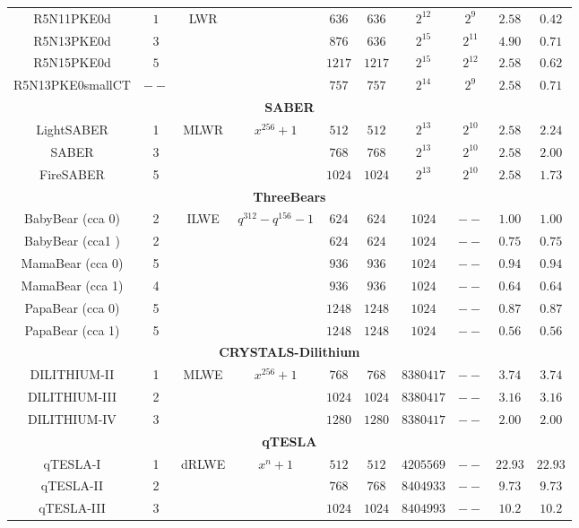 \documentclass{cta-author}
\begin{document}
\begin{table}[pt]
\begin{tabular}{ c| c| c | c || c | c | c |c||c| c }
		
		
		
		\hline
		R5N11PKE0d&$1$&\multirow{4}{*}{LWR}&& $636$&$636$&$2^{12}$&$2^{9}$& $2.58$&$0.42$\\
		
		
		R5N13PKE0d&$3$&&& $876$&$636$&$2^{15}$&$2^{11}$& $4.90$&$0.71$\\
		
		R5N15PKE0d&$5$&&& $1217$&$1217$&$2^{15}$&$2^{12}$& $2.58$&$0.62$\\
		
		R5N13PKE0smallCT&$--$&&& $757$&$757$&$2^{14}$&$2^{9}$& $2.58$&$0.71$\\
		\hline
		\hline
		\multicolumn{10}{c}{\textbf{SABER}}\\
		\hline
		LightSABER&1&\multirow{3}{*}{MLWR}&\multirow{3}{*}{$x^{256}+1$}& $512$&$512$&$2^{13}$&$2^{10}$& $2.58$&$2.24$\\
		SABER&3&&& $768$&$768$&$2^{13}$&$2^{10}$& $2.58$&$2.00$\\
		FireSABER&5&&& $1024$&$1024$&$2^{13}$&$2^{10}$& $2.58$&$1.73$\\
		\hline
		\hline
		\multicolumn{10}{c}{\textbf{ThreeBears}}\\
		\hline
		
		BabyBear (cca 0)&2&\multirow{6}{*}{ILWE}&\multirow{6}{*}{$q^{312}-q^{156}-1$}& $624$&$624$&$1024$&$--$& $1.00$&$1.00$\\
		BabyBear (cca1 )&2&&& $624$&$624$&$1024$&$--$& $0.75$&$0.75$\\
		
		MamaBear (cca 0)&5&&& $936$&$936$&$1024$&$--$& $0.94$&$0.94$\\
		MamaBear (cca 1)&4&&& $936$&$936$&$1024$&$--$& $0.64$&$0.64$\\
		PapaBear (cca 0)&5&&& $1248$&$1248$&$1024$&$--$& $0.87$&$0.87$\\
		PapaBear (cca 1)&5&&& $1248$&$1248$&$1024$&$--$& $0.56$&$0.56$\\
		\hline
		\hline
		\multicolumn{10}{c}{\textbf{CRYSTALS-Dilithium}}\\
		\hline
		
		DILITHIUM-II&1&\multirow{3}{*}{MLWE}&\multirow{3}{*}{$x^{256}+1$}& $768$&$768$&$8380417$&$--$& $3.74$&$3.74$\\
		DILITHIUM-III&2&&& $1024$&$1024$&$8380417$&$--$& $3.16$&$3.16$\\
		DILITHIUM-IV&3&&& $1280$&$1280$&$8380417$&$--$& $2.00$&$2.00$\\
		\hline
		\hline
		\multicolumn{10}{c}{\textbf{qTESLA}}\\
		\hline
		
		qTESLA-I&1&\multirow{3}{*}{dRLWE}&\multirow{3}{*}{$x^{n}+1$}& $512$&$512$&$4205569$&$--$& $22.93$&$22.93$\\
		qTESLA-II&2&&& $768$&$768$&$8404933$&$--$& $9.73$&$9.73$\\
		qTESLA-III&3&&& $1024$&$1024$&$8404993$&$--$& $10.2$&$10.2$\\

		\hline
		\hline
	\end{tabular}
	\label{tab9}
\end{table}
\end{document}
